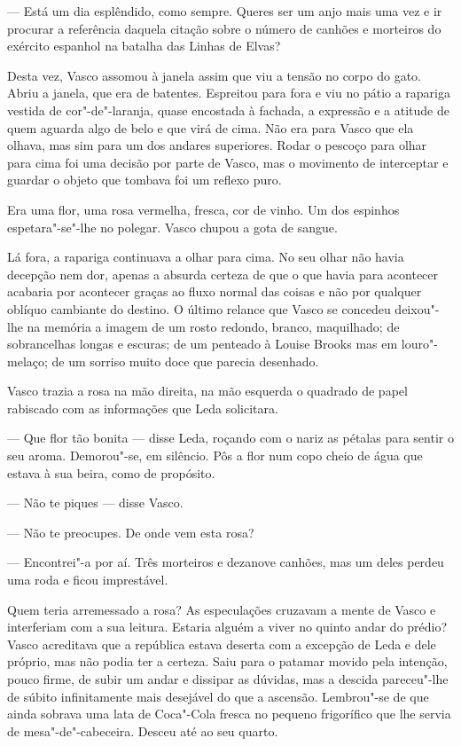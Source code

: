 --- Está um dia esplêndido, como sempre. Queres ser um anjo mais uma vez
e ir procurar a referência daquela citação sobre o número de canhões e
morteiros do exército espanhol na batalha das Linhas de Elvas?

Desta vez, Vasco assomou à janela assim que viu a tensão no corpo do
gato. Abriu a janela, que era de batentes. Espreitou para fora e viu
no pátio a rapariga vestida de cor"-de"-laranja, quase encostada à fachada, a expressão e a atitude de quem
aguarda algo de belo e que virá de cima. Não era para Vasco que ela
olhava, mas sim para um dos andares superiores. Rodar o pescoço para
olhar para cima foi uma decisão por parte de Vasco, mas o movimento de
interceptar e guardar o objeto que tombava foi um reflexo puro.

Era uma flor, uma rosa vermelha, fresca, cor de vinho. Um dos espinhos
espetara"-se"-lhe no polegar. Vasco chupou a gota de sangue.

Lá fora, a rapariga continuava a olhar para cima. No seu olhar não havia
decepção nem dor, apenas a absurda certeza de que o que havia para
acontecer acabaria por acontecer graças ao fluxo normal das coisas e não
por qualquer oblíquo cambiante do destino. O último relance que Vasco se
concedeu deixou"-lhe na memória a imagem de um rosto redondo, branco,
maquilhado; de sobrancelhas longas e escuras; de um penteado à Louise
Brooks mas em louro"-melaço; de um sorriso muito doce que parecia
desenhado.

Vasco trazia a rosa na mão direita, na mão esquerda o quadrado de papel
rabiscado com as informações que Leda solicitara.

--- Que flor tão bonita --- disse Leda, roçando com o nariz
as pétalas para sentir o seu aroma. Demorou"-se, em silêncio. Pôs a flor
num copo cheio de água que estava à sua beira, como de propósito.

--- Não te piques --- disse Vasco.

--- Não te preocupes. De onde vem esta rosa?

--- Encontrei"-a por aí. Três morteiros e dezanove canhões, mas um deles
  perdeu uma roda e ficou imprestável.

Quem teria arremessado a rosa? As especulações cruzavam a mente de
Vasco e interferiam com a sua leitura. Estaria alguém a viver no quinto
andar do prédio? Vasco acreditava que a república estava deserta com a
excepção de Leda e dele próprio, mas não podia ter a certeza. Saiu para
o patamar movido pela intenção, pouco firme, de subir um andar e
dissipar as dúvidas, mas a descida pareceu"-lhe de súbito infinitamente
mais desejável do que a ascensão. Lembrou"-se de que ainda sobrava uma
lata de Coca"-Cola fresca no pequeno frigorífico que lhe servia de
mesa"-de"-cabeceira. Desceu até ao seu quarto.

